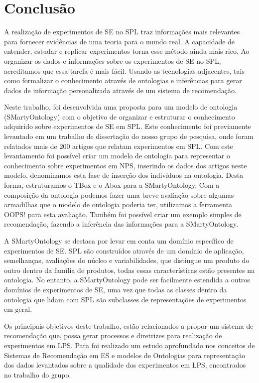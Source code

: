 \chapter{Conclusão}
\label{sec:conclusao}

A realização de experimentos de SE no SPL traz informações mais relevantes para fornecer evidências de uma teoria para o mundo real. A capacidade de entender, estudar e replicar experimentos torna esse método ainda mais rico. Ao organizar os dados e informações sobre os experimentos de SE no SPL, acreditamos que essa tarefa é mais fácil. Usando as tecnologias adjacentes, tais como formalizar o conhecimento através de ontologias e inferências para gerar dados de informação personalizada através de um sistema de recomendação.

Neste trabalho, foi desenvolvida uma proposta para um modelo de ontologia (SMartyOntology) com o objetivo de organizar e estruturar o conhecimento adquirido sobre experimentos de SE em SPL. Este conhecimento foi previamente levantado em um trabalho de dissertação do nosso grupo de pesquisa, onde foram relatados mais de 200 artigos que relatam experimentos em SPL. Com este levantamento foi possível criar um modelo de ontologia para representar o conhecimento sobre experimentos em NPS, inserindo os dados dos artigos neste modelo, denominamos esta fase de inserção dos indivíduos na ontologia. Desta forma, estruturamos o TBox e o Abox para a SMartyOntology. Com a composição da ontologia podemos fazer uma breve avaliação sobre algumas armadilhas que o modelo de ontologia poderia ter, utilizamos a ferramenta OOPS! para esta avaliação. Também foi possível criar um exemplo simples de recomendação, fazendo a inferência das informações para a SMartyOntology.

A SMartyOntology se destaca por levar em conta um domínio específico de experimentos de SE. SPL são construídos através de um domínio de aplicação, semelhanças, avaliações do núcleo e variabilidades, que distingue um produto do outro dentro da família de produtos, todas essas características estão presentes na ontologia. No entanto, a SMartyOntology pode ser facilmente estendida a outros domínios de experimentos de SE, uma vez que todas as classes dentro da ontologia que lidam com SPL são subclasses de representações de experimentos em geral.

Os principais objetivos deste trabalho, estão relacionados a propor um sistema de recomendação que, possa gerar processos e diretrizes para realização de experimentos em LPS. Para foi realizado um estudo aprofundado nos conceitos de Sistemas de Recomendação em ES e modelos de Ontologias para representação dos dados levantados sobre a qualidade dos experimentos em LPS, encontrados no trabalho do grupo.


